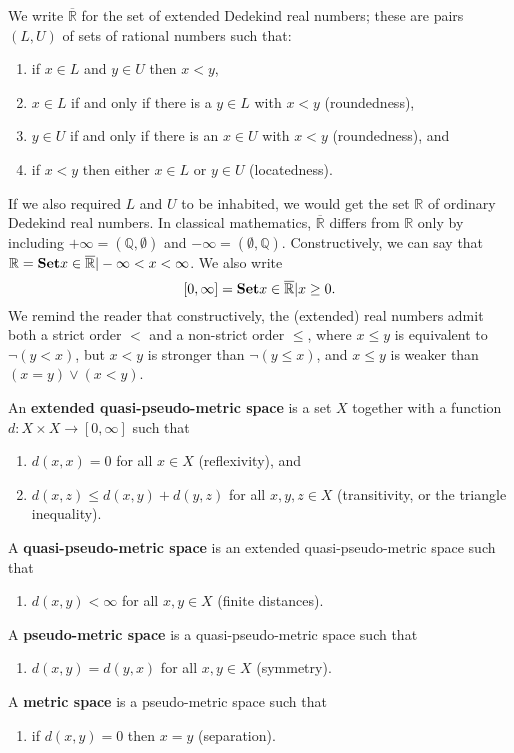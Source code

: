 \documentclass{article}
\def\R{\mathbb{R}}
\def\Re{\overline{\mathbb{R}}}
\def\Rp{[0,\infty]}
\begin{document}
We write $\Re$ for the set of extended Dedekind real numbers; these are pairs $(L,U)$ of sets of rational numbers such that:
\begin{enumerate}
\item if $x\in L$ and $y\in U$ then $x<y$,
\item $x\in L$ if and only if there is a $y\in L$ with $x<y$ (roundedness),
\item $y\in U$ if and only if there is an $x\in U$ with $x<y$ (roundedness), and
\item if $x<y$ then either $x\in L$ or $y\in U$ (locatedness).
\end{enumerate}
If we also required $L$ and $U$ to be inhabited, we would get the set $\R$ of ordinary Dedekind real numbers.
In classical mathematics, $\Re$ differs from $\R$ only by including $+\infty = (\mathbb{Q},\emptyset)$ and $-\infty = (\emptyset,\mathbb{Q})$.
Constructively, we can say that $\R = \setof{ x\in \Re | -\infty < x < \infty }$.
We also write
\[\Rp = \setof{x\in\Re | x\ge 0 }.\]
We remind the reader that constructively, the (extended) real numbers admit both a strict order $<$ and a non-strict order $\le$, where $x\le y$ is equivalent to $\neg(y<x)$, but $x<y$ is stronger than $\neg(y\le x)$, and $x\le y$ is weaker than $(x=y)\lor (x<y)$.

\begin{defn}
  An \textbf{extended quasi-pseudo-metric space} is a set $X$ together with a function $d:X\times X \to \Rp$ such that
  \begin{enumerate}
  \item $d(x,x)=0$ for all $x\in X$ (reflexivity), and
  \item $d(x,z)\le d(x,y)+d(y,z)$ for all $x,y,z\in X$ (transitivity, or the triangle inequality).
  \end{enumerate}
  A \textbf{quasi-pseudo-metric space} is an extended quasi-pseudo-metric space such that
  \begin{enumerate}[resume]
  \item $d(x,y)<\infty$ for all $x,y\in X$ (finite distances).
  \end{enumerate}
  A \textbf{pseudo-metric space} is a quasi-pseudo-metric space such that
  \begin{enumerate}[resume]
  \item $d(x,y)=d(y,x)$ for all $x,y\in X$ (symmetry).
  \end{enumerate}
  A \textbf{metric space} is a pseudo-metric space such that
  \begin{enumerate}[resume]
  \item if $d(x,y)=0$ then $x=y$ (separation).
  \end{enumerate}
\end{defn}
\end{document}
